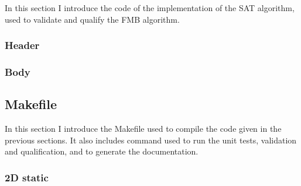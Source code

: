 \documentclass[12pt, a4paper]{article}
\begin{document}
In this section I introduce the code of the implementation of the SAT algorithm, used to validate and qualify the FMB algorithm.\\

\subsubsection{Header}

\begin{scriptsize}
\begin{ttfamily}

\end{ttfamily}
\end{scriptsize}

\subsubsection{Body}

\begin{scriptsize}
\begin{ttfamily}

\end{ttfamily}
\end{scriptsize}

\subsection{Makefile}

In this section I introduce the Makefile used to compile the code given in the previous sections. It also includes command used to run the unit tests, validation and qualification, and to generate the documentation.\\

\begin{scriptsize}
\begin{ttfamily}

\end{ttfamily}
\end{scriptsize}

\subsubsection{2D static}

\begin{scriptsize}
\begin{ttfamily}

\end{ttfamily}
\end{scriptsize}
\end{document}
